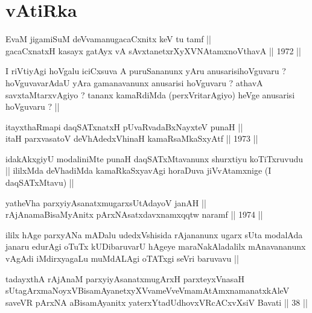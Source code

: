\section*{vAtiRka}


\begin{shl}
EvaM jigamiSuM deVvamanugacaCxnitx keV tu tamf || \\
gacaCxnatxH kasayx gatAyx vA sAvxtanetxrXyXVNA\s \s tamxnoV\s thavA ||  1972 ||  
\end{shl}

\begin{artha}
I riVtiyAgi hoVgalu iciCxsuva A puruSananunx yAru anusarisihoVguvaru ?
hoVguvavarAdaU yAra gamanavanunx anusarisi hoVguvaru ? athavA
savxtaMtarxvAgiyo ? tananx kamaRdiMda (perxVritarAgiyo) heVge
anusarisi hoVguvaru ? ||
\end{artha}

\begin{shl}
itayxthaRmapi daqSATxnatxH pUvaRvadaBxNayxteV punaH || \\
itaH parxvasatoV deVhAdedxVhinaH kamaRsaMkaSxyAtf ||  1973 ||  
\end{shl}

\begin{artha}
idakAkxgiyU modaliniMte punaH daqSATxMtavanunx shurxtiyu koTiTxruvudu
|| ililxMda deVhadiMda kamaRkaSxyavAgi horaDuva jiVvAtamxnige (I
daqSATxMtavu) ||
\end{artha}


\begin{shl}
yatheVha parxyiyAsanatxmugarxsUtAdayoV janAH || \\
rAjAnamaBisaMyAnitx pArxNAsatxdavxnamxqqtw naramf ||  1974 ||  
\end{shl}

\begin{artha}
ililx hAge parxyANa mADalu udedxVshisida rAjananunx ugarx sUta
modalAda janaru edurAgi oTuTx kUDibaruvarU hAgeye maraNakAladalilx
mAnavananunx vAgAdi iMdirxyagaLu muMdALAgi oTATxgi seVri baruvavu ||
\end{artha}

\begin{shl}
tadayxthA rAjAnaM parxyiyAsanatxmugArxH parxteyxVnasaH sUtagArxmaNoyxV\s BisamAyanetxyXVvameVveVmamAtAmxnamanatxkAleV saveVR pArxNA aBisamAyanitx yaterxYtadUdhovxVRcACxvXsiV Bavati || 38 ||
\end{shl}

